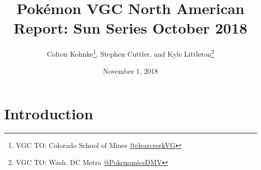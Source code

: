 \documentclass[11pt,twocolumn]{article}
\title{Pokémon VGC North American Report: Sun Series October 2018}
\author{Colton Kohnke\thanks{VGC TO: Colorado School of Mines \href{https://twitter.com/clearcreekVG}{@clearcreekVG}}, Stephen Cuttler, and Kyle Littleton\thanks{VGC TO: Wash. DC Metro \href{https://twitter.com/PokenomicsDMV}{@PokenomicsDMV}}}
\date{November 1, 2018}
\begin{document}
\maketitle

\section*{Introduction}
\end{document}
